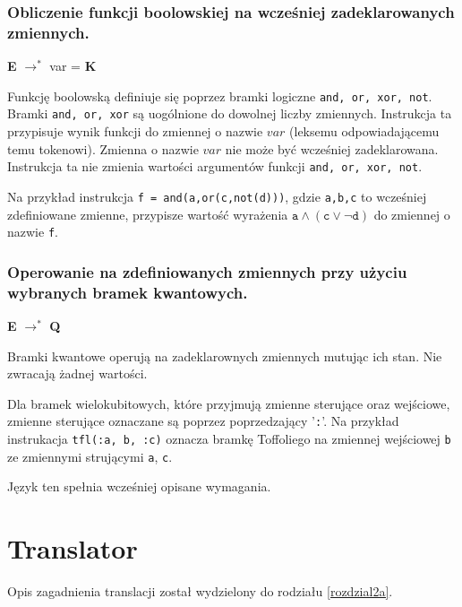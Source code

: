 \subsubsection{Obliczenie funkcji boolowskiej na wcześniej zadeklarowanych zmiennych.}
\begin{center}
    \textbf{E} $\rightarrow^*$ var = \textbf{K}
\end{center}
Funkcję boolowską definiuje się poprzez bramki logiczne \texttt{and, or, xor, not}. Bramki \texttt{and, or, xor} są uogólnione do dowolnej liczby zmiennych. Instrukcja ta przypisuje wynik funkcji do zmiennej o nazwie $var$ (leksemu odpowiadającemu temu tokenowi). Zmienna o nazwie $var$ nie może być wcześniej zadeklarowana. Instrukcja ta nie zmienia wartości argumentów funkcji \texttt{and, or, xor, not}. 
\par Na przykład instrukcja \texttt{f = and(a,or(c,not(d)))}, gdzie \texttt{a,b,c} to wcześniej zdefiniowane zmienne, przypisze wartość wyrażenia $\texttt{a} \land (\texttt{c} \lor \neg \texttt{d})$ do zmiennej o nazwie \texttt{f}.
\subsubsection{Operowanie na zdefiniowanych zmiennych przy użyciu wybranych bramek kwantowych.}
\begin{center}
    \textbf{E} $\rightarrow^*$ \textbf{Q}
\end{center}
Bramki kwantowe operują na zadeklarownych zmiennych mutując ich stan. Nie zwracają żadnej wartości.
\par Dla bramek wielokubitowych, które przyjmują zmienne sterujące oraz wejściowe, zmienne sterujące oznaczane są poprzez poprzedzający '\texttt{:}'. Na przykład instrukacja \texttt{tfl(:a, b, :c)} oznacza bramkę Toffoliego na zmiennej wejściowej \texttt{b} ze zmiennymi strującymi \texttt{a}, \texttt{c}.\\
\par Język ten spełnia wcześniej opisane wymagania.
\section{Translator}
Opis zagadnienia translacji został wydzielony do rodziału \ref{rozdzial2a}.
